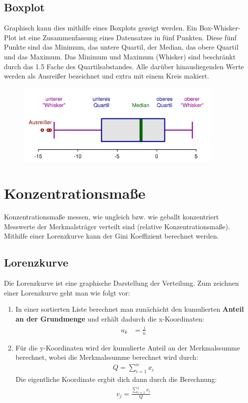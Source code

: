 \documentclass[a4paper,10pt]{scrartcl}
\begin{document}
\subsection{Boxplot}
Graphisch kann dies mithilfe eines Boxplots gezeigt werden. Ein Box-Whisker-Plot ist eine Zusammenfassung eines Datensatzes in fünf Punkten. Diese fünf Punkte sind das Minimum, das untere Quartil, der Median, das obere Quartil und das Maximum.\newline
Das Minimum und Maximum (Whisker) sind beschränkt durch das 1.5 Fache des Quartilsabstandes. Alle darüber hinausliegenden Werte werden als Ausreißer bezeichnet und extra mit einem Kreis makiert.
\begin{figure}[h] 
  \centering
     \includegraphics[width=0.9\textwidth]{Boxplot.png}
  \label{fig:Bild1}
\end{figure}
\section{Konzentrationsmaße}
Konzentrationsmaße messen, wie ungleich bzw. wie geballt konzentriert Messwerte der Merkmalsträger verteilt sind (relative Konzentrationsmaße). Mithilfe einer Lorenzkurve kann der Gini Koeffizient berechnet werden.
\subsection{Lorenzkurve}
Die Lorenzkurve ist eine graphische Darstellung der Verteilung.
Zum zeichnen einer Lorenzkurve geht man wie folgt vor:
\begin{enumerate}
    \item In einer sortierten Liste berechnet man zunächächt den kumulierten \textbf{Anteil an der Grundmenge} und erhält dadurch die x-Koordinaten:
    \begin{align*}
    u_k&=\frac{j}{n}
    \end{align*}
    \item Für die y-Koordinaten wird der kumulierte Anteil an der Merkmalssumme berechnet, wobei die Merkmalssumme berechnet wird durch:
    \begin{align*}
    Q=\sum_{i=1}^n x_i
    \end{align*}
    Die eigentliche Koordinate ergbit dich dann durch die Berechnung:
    \begin{align*}
    v_j=\frac{\sum_{i=1}^j x_i}{Q}
    \end{align*}
\end{enumerate}
\end{document}

